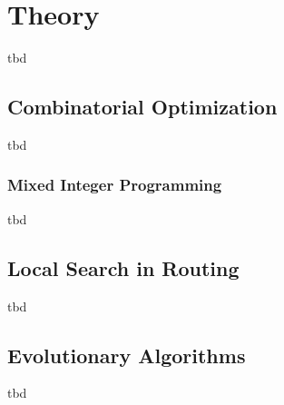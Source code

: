 \chapter{Theory} \label{chap:theory}

tbd

\section{Combinatorial Optimization}

tbd

\subsection{Mixed Integer Programming}

tbd

\section{Local Search in Routing}

tbd

\section{Evolutionary Algorithms}

tbd

\newpage